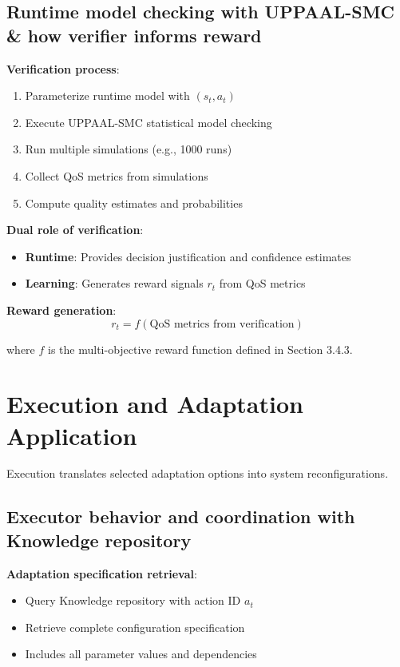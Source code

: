 \documentclass[11pt,a4paper]{article}
\begin{document}
\subsection{Runtime model checking with UPPAAL-SMC \& how verifier informs reward}

\textbf{Verification process}:
\begin{enumerate}
    \item Parameterize runtime model with $(s_t, a_t)$
    \item Execute UPPAAL-SMC statistical model checking
    \item Run multiple simulations (e.g., 1000 runs)
    \item Collect QoS metrics from simulations
    \item Compute quality estimates and probabilities
\end{enumerate}

\textbf{Dual role of verification}:
\begin{itemize}
    \item \textbf{Runtime}: Provides decision justification and confidence estimates
    \item \textbf{Learning}: Generates reward signals $r_t$ from QoS metrics
\end{itemize}

\textbf{Reward generation}:
\begin{equation}
r_t = f(\text{QoS metrics from verification})
\end{equation}

where $f$ is the multi-objective reward function defined in Section 3.4.3.

\section{Execution and Adaptation Application}

Execution translates selected adaptation options into system reconfigurations.

\subsection{Executor behavior and coordination with Knowledge repository}

\textbf{Adaptation specification retrieval}:
\begin{itemize}
    \item Query Knowledge repository with action ID $a_t$
    \item Retrieve complete configuration specification
    \item Includes all parameter values and dependencies
\end{itemize}
\end{document}
